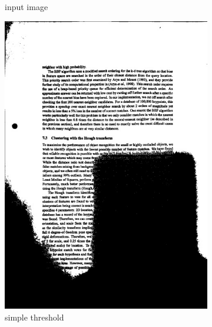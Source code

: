 \documentclass[bibliography=totoc]{scrartcl}
\begin{document}
\begin{figure}[ht!]
\begin{subfigure}[t]{0.3\linewidth}
		\caption{input image}
		\label{subfig:shadow_input}
	\end{subfigure}
	\begin{subfigure}[t]{0.28\linewidth}
		\includegraphics[width=\linewidth]{imgs/threshold/bad_lighting_simple.jpg}
		\caption{simple threshold}
		\label{subfig:simple_thresholding}
	\end{subfigure}
	\begin{subfigure}[t]{0.28\linewidth}

\end{subfigure}
\end{figure}
\end{document}

